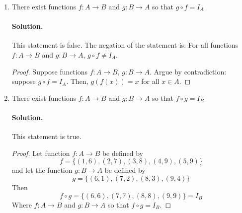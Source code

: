 \documentclass[12pt]{article}
\begin{document}
\begin{enumerate}[label=\textbf{\alph*.}]
\begin{proof}
        Therefore, $g \circ f \neq I_A$.
    \end{proof}

    \item There exist functions $f : A \rightarrow B$ and $g : B \rightarrow A$ so that $g \circ f = I_A$
    \paragraph*{Solution.} This statement is false. The negation of the statement is: For all functions $f : A \rightarrow B$ and $g : B \rightarrow A$, $g \circ f \neq I_A$.

    \begin{proof}
        Suppose functions $f : A \rightarrow B$, $g : B \rightarrow A$. Argue by contradiction: suppose $g \circ f = I_A$. Then, $g(f(x)) = x$ for all $x \in A$.
    \end{proof}

    \item There exist functions $f : A \rightarrow B$ and $g : B \rightarrow A$ so that $f \circ g = I_B$
    \paragraph*{Solution.} This statement is true.

    \begin{proof}
        Let function $f : A \rightarrow B$ be defined by $$f = \{(1,6), (2,7), (3,8), (4,9), (5,9)\}$$
        and let the function $g : B \rightarrow A$ be defined by $$g = \{(6,1), (7,2), (8,3), (9,4)\}$$
        Then $$f \circ g = \{(6, 6), (7, 7), (8, 8), (9, 9)\} = I_B$$
        Where $f : A \rightarrow B$ and $g : B \rightarrow A$ so that $f \circ g = I_B$.
    \end{proof}

\end{enumerate}
    
\end{document}
